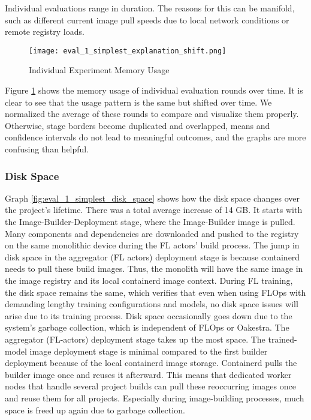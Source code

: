 Individual evaluations range in duration.
The reasons for this can be manifold, such as different current image pull speeds due to local network conditions or remote registry loads.
\begin{figure}[h]
        \centering
        \texttt{[image: eval\_1\_simplest\_explanation\_shift.png]}
        \caption{Individual Experiment Memory Usage}
        \label{fig:eval_1_simplest_explanation_shift}
\end{figure}
Figure \ref{fig:eval_1_simplest_explanation_shift} shows the memory usage of individual evaluation rounds over time.
It is clear to see that the usage pattern is the same but shifted over time.
We normalized the average of these rounds to compare and visualize them properly.
Otherwise, stage borders become duplicated and overlapped, means and confidence intervals do not lead to meaningful outcomes, and the graphs are more confusing than helpful.

\subsubsection{Disk Space}

Graph \ref{fig:eval_1_simplest_disk_space} shows how the disk space changes over the project's lifetime.
There was a total average increase of 14 GB.
It starts with the Image-Builder-Deployment stage, where the Image-Builder image is pulled.
Many components and dependencies are downloaded and pushed to the registry on the same monolithic device during the FL actors' build process.
The jump in disk space in the aggregator (FL actors) deployment stage is because containerd needs to pull these build images.
Thus, the monolith will have the same image in the image registry and its local containerd image context.
During FL training, the disk space remains the same, which verifies that even when using FLOps with demanding lengthy training configurations and models, no disk space issues will arise due to its training process.
Disk space occasionally goes down due to the system's garbage collection, which is independent of FLOps or Oakestra.
The aggregator (FL-actors) deployment stage takes up the most space.
The trained-model image deployment stage is minimal compared to the first builder deployment because of the local containerd image storage.
Containerd pulls the builder image once and reuses it afterward.
This means that dedicated worker nodes that handle several project builds can pull these reoccurring images once and reuse them for all projects.
Especially during image-building processes, much space is freed up again due to garbage collection.

